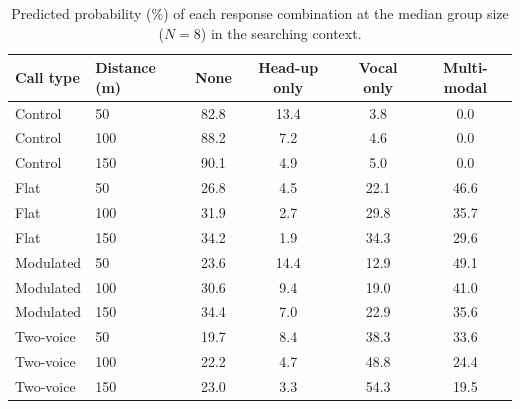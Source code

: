 \begin{table}[H]
\centering
\caption{Predicted probability (\%) of each response combination at the median group size ($N=8$) in the searching context.}
\label{tab:p3combopred}
\small
\begin{tabular}{llcccc}
\toprule
Call type & Distance (m) & None & Head-up only & Vocal only & Multi-modal \\
\midrule
Control & 50 & 82.8 & 13.4 & 3.8 & 0.0 \\
Control & 100 & 88.2 & 7.2 & 4.6 & 0.0 \\
Control & 150 & 90.1 & 4.9 & 5.0 & 0.0 \\
Flat & 50 & 26.8 & 4.5 & 22.1 & 46.6 \\
Flat & 100 & 31.9 & 2.7 & 29.8 & 35.7 \\
Flat & 150 & 34.2 & 1.9 & 34.3 & 29.6 \\
Modulated & 50 & 23.6 & 14.4 & 12.9 & 49.1 \\
Modulated & 100 & 30.6 & 9.4 & 19.0 & 41.0 \\
Modulated & 150 & 34.4 & 7.0 & 22.9 & 35.6 \\
Two-voice & 50 & 19.7 & 8.4 & 38.3 & 33.6 \\
Two-voice & 100 & 22.2 & 4.7 & 48.8 & 24.4 \\
Two-voice & 150 & 23.0 & 3.3 & 54.3 & 19.5 \\
\bottomrule
\end{tabular}
\end{table}
